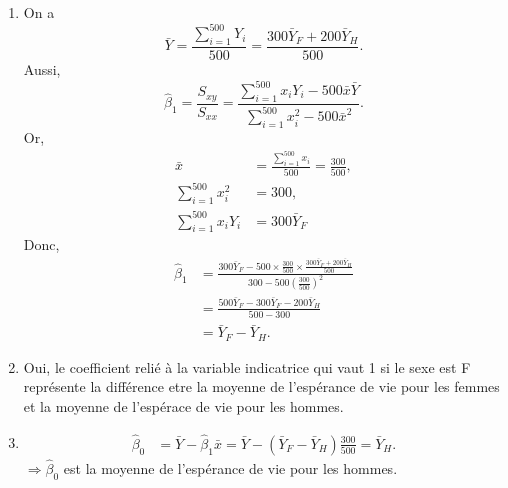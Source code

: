 \begin{solution}{2.19}
\begin{enumerate}
\item On a $$\bar{Y}=\frac{\sum_{i=1}^{500}Y_i}{500}=\frac{300\bar{Y}_F+200\bar{Y}_H}{500}.$$ Aussi,
$$\hat{\beta}_1=\frac{S_{xy}}{S_{xx}}=\frac{\sum_{i=1}^{500}x_iY_i-500\bar{x}\bar{Y}}{\sum_{i=1}^{500}x_i^2-500\bar{x}^2}.$$  Or,
\begin{align*}
\bar{x}&=\frac{\sum_{i=1}^{500}x_i}{500}=\frac{300}{500},\\
\sum_{i=1}^{500}x_i^2&=300,\\
\sum_{i=1}^{500}x_i Y_i&=300\bar{Y}_F
\end{align*}
Donc,
\begin{align*}
\hat{\beta}_1&=\frac{300\bar{Y}_F-500\times\frac{300}{500}\times\frac{300\bar{Y}_F+200\bar{Y}_H}{500}}{300-500\left(\frac{300}{500}\right)^2}\\
&=\frac{500\bar{Y}_F-300\bar{Y}_F-200\bar{Y}_H}{500-300}\\
&=\bar{Y}_F-\bar{Y}_H.
\end{align*}

\item Oui, le coefficient relié à la variable indicatrice qui vaut 1 si le sexe est F représente la différence etre la moyenne de l'espérance de vie pour les femmes et la moyenne de l'espérace de vie pour les hommes.

\item
\begin{align*}
\hat{\beta}_0&=\bar{Y}-\hat{\beta}_1\bar{x}=\bar{Y}-(\bar{Y}_F-\bar{Y}_H)\frac{300}{500}=\bar{Y}_H.
\end{align*}
$\Rightarrow \hat{\beta}_0$ est la moyenne de l'espérance de vie pour les hommes.

\end{enumerate}
\end{solution}
